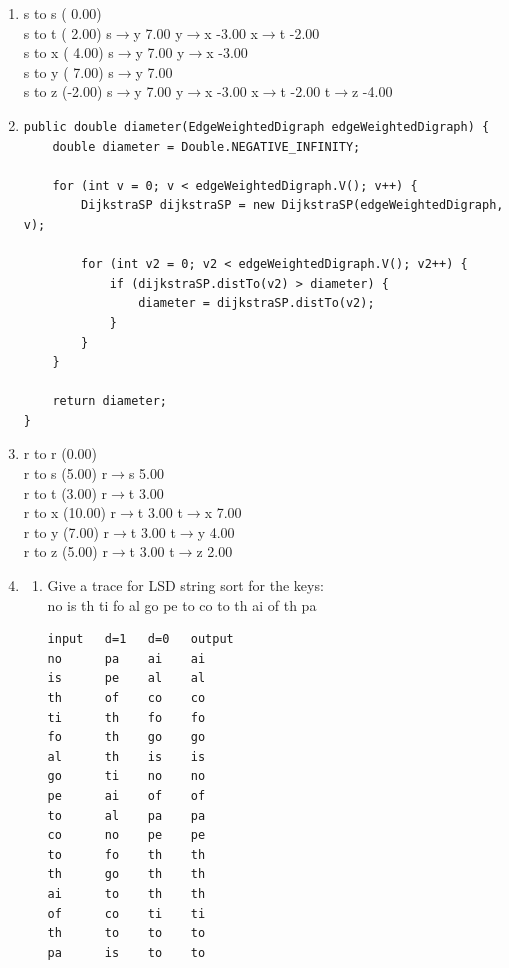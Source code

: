 \documentclass[11pt,fleqn]{article}
\begin{document}
\begin{enumerate}
	\item
s to s ( 0.00)  \\
s to t ( 2.00)  s$\rightarrow$y  7.00   y$\rightarrow$x -3.00   x$\rightarrow$t -2.00   \\
s to x ( 4.00)  s$\rightarrow$y  7.00   y$\rightarrow$x -3.00   \\
s to y ( 7.00)  s$\rightarrow$y  7.00   \\
s to z (-2.00)  s$\rightarrow$y  7.00   y$\rightarrow$x -3.00   x$\rightarrow$t -2.00   t$\rightarrow$z -4.00   \\

	\item 
\begin{Verbatim}
public double diameter(EdgeWeightedDigraph edgeWeightedDigraph) {
	double diameter = Double.NEGATIVE_INFINITY;

	for (int v = 0; v < edgeWeightedDigraph.V(); v++) {
		DijkstraSP dijkstraSP = new DijkstraSP(edgeWeightedDigraph, v);

		for (int v2 = 0; v2 < edgeWeightedDigraph.V(); v2++) {
			if (dijkstraSP.distTo(v2) > diameter) {
				diameter = dijkstraSP.distTo(v2);
			}
		}
	}

	return diameter;
}
\end{Verbatim}

	\item
r to r (0.00)  \\
r to s (5.00)  r$\rightarrow$s  5.00   \\
r to t (3.00)  r$\rightarrow$t  3.00   \\
r to x (10.00)  r$\rightarrow$t  3.00   t$\rightarrow$x  7.00   \\
r to y (7.00)  r$\rightarrow$t  3.00   t$\rightarrow$y  4.00   \\
r to z (5.00)  r$\rightarrow$t  3.00   t$\rightarrow$z  2.00

	\item
	\begin{enumerate}
		\item
Give a trace for LSD string sort for the keys:  \\
no is th ti fo al go pe to co to th ai of th pa 
\begin{Verbatim}
input   d=1   d=0   output 
no      pa    ai    ai
is      pe    al    al
th      of    co    co
ti      th    fo    fo
fo      th    go    go
al      th    is    is
go      ti    no    no
pe      ai    of    of
to      al    pa    pa
co      no    pe    pe
to      fo    th    th
th      go    th    th
ai      to    th    th
of      co    ti    ti
th      to    to    to
pa      is    to    to
\end{Verbatim}


\end{enumerate}
\end{enumerate}
\end{document}
